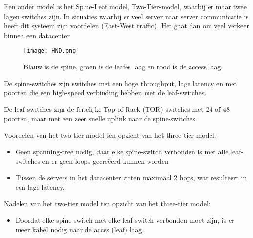 Een ander model is het Spine-Leaf model, Two-Tier-model, waarbij er maar twee lagen switches zijn. In situaties waarbij er veel server naar server communicatie is heeft dit systeem zijn voordelen (East-West traffic). Het gaat dan om veel verkeer binnen een datacenter

\begin{figure}[H]
\centering
\texttt{[image: HND.png]}
\caption{Blauw is de spine, groen is de leafes laag en rood is de access laag}
\label{HND}
\end{figure}

De spine-switches zijn switches met een hoge throughput, lage latency en met poorten die een high-speed verbinding hebben met de leaf-switches.

De leaf-switches zijn de feitelijke Top-of-Rack (TOR) switches met 24 of 48 poorten, maar met een zeer snelle uplink naar de spine-switches.

Voordelen van het two-tier model ten opzicht van het three-tier model:
\begin{itemize}
\item Geen spanning-tree nodig, daar elke spine-switch verbonden is met alle leaf-switches en er geen loops gecre\"eerd kunnen worden
\item Tussen de servers in het datacenter zitten maximaal 2 hops, wat resulteert in een lage latency.
\end{itemize}

Nadelen van het two-tier model ten opzicht van het three-tier model:
\begin{itemize}
\item Doordat elke spine switch met elke leaf switch verbonden moet zijn, is er meer kabel nodig naar de acces (leaf) laag.
\end{itemize}
